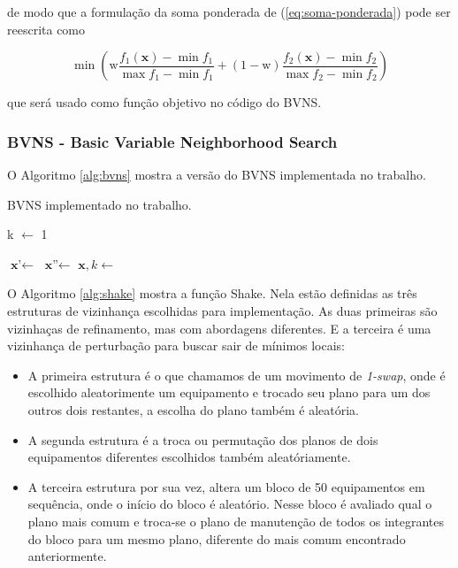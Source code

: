\documentclass[conference]{IEEEtran}
\begin{document}
\noindent de modo que a formulação da soma ponderada de (\ref{eq:soma-ponderada})
pode ser reescrita como  

\[ \min \left( \mathrm{w}\frac{f_1(\mathbf{x}) - \min f_1}{\max f_1 - \min f_1} 
+ (1-\mathrm{w})\frac{f_2(\mathbf{x}) - \min f_2}{\max f_2 - \min f_2}\right)    \]   


\noindent que será usado como função objetivo no código do BVNS.

\subsubsection{BVNS - Basic Variable Neighborhood Search}

O Algoritmo \ref{alg:bvns} mostra a versão do BVNS implementada 
no trabalho.

\begin{algorithm}[H]
	\caption{BVNS implementado no trabalho.}\label{alg:bvns}
	\begin{algorithmic}[1]
			\State k $\gets$ 1

				\State $ \textbf{x'} \gets$  
				\State $ \textbf{x''} \gets$  
				\State $ \textbf{x}, k \gets$  
			\EndWhile
		\EndWhile
	\EndProcedure 
	\end{algorithmic}
\end{algorithm}

O Algoritmo \ref{alg:shake} mostra a função Shake. Nela estão definidas as três estruturas de vizinhança escolhidas para implementação. As duas primeiras
são vizinhaças de refinamento, mas com abordagens diferentes. E a terceira é uma vizinhança de perturbação para buscar sair de mínimos locais:
\begin{itemize}
	\item A primeira estrutura é o que chamamos de um movimento de \textit{1-swap}, onde é escolhido aleatorimente um equipamento e trocado seu plano para um dos outros dois
	restantes, a escolha do plano também é aleatória.
	\item A segunda estrutura é a troca ou permutação dos planos de dois equipamentos diferentes escolhidos também aleatóriamente.
	\item A terceira estrutura por sua vez, altera um bloco de 50 equipamentos em sequência, onde o início do bloco é aleatório. Nesse bloco é avaliado qual o plano mais comum
	e troca-se o plano de manutenção de todos os integrantes do bloco para um mesmo plano, diferente do mais comum encontrado anteriormente.
\end{itemize}
\end{document}
